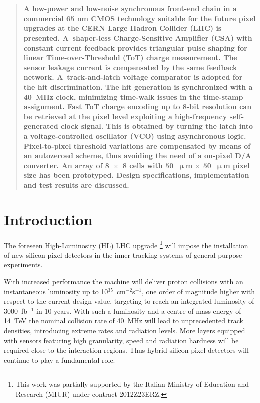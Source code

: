 \documentclass[conference]{./templates/IEEEtran/IEEEtran}
\begin{document}
\section*{  }
\begin{abstract}
{\bf A low-power and low-noise synchronous front-end chain in a commercial 65 nm CMOS technology
suitable for the future pixel upgrades at the CERN Large Hadron Collider (LHC) is 
presented. A~shaper-less Charge-Sensitive Amplifier (CSA) with constant current feedback
provides triangular pulse shaping for linear Time-over-Threshold (ToT) 
charge measurement. The sensor leakage current is compensated 
by the same feedback network. A~track-and-latch voltage comparator 
is adopted for the hit discrimination. The hit generation is synchronized with a 
40~MHz clock, minimizing time-walk issues in the time-stamp assignment. 
Fast ToT charge encoding up to 8-bit resolution can be retrieved at the pixel 
level exploiting a high-frequency self-generated clock signal. This is obtained by turning 
the latch into a voltage-controlled oscillator (VCO) using asynchronous logic. 
Pixel-to-pixel threshold variations are compensated by means of an autozeroed 
scheme, thus avoiding the need of a on-pixel D/A converter.
An array of 8~$\times$~8 cells with 50~$\bm{\upmu}$m $\times$ 50~$\bm{\upmu}$m pixel size has been prototyped.
Design specifications, implementation and test results are discussed.}
\end{abstract}




\vspace*{1.2cm}

\section{Introduction}


\noindent The foreseen High-Luminosity (HL) LHC upgrade \cite{Rossi2012}
\let\thefootnote\relax\footnote{This work was partially 
supported by the Italian Ministry of Education and Research 
(MIUR) under contract 2012Z23ERZ.}
will impose the installation of new silicon pixel detectors 
in the inner tracking systems of general-purpose experiments. 

With increased performance the machine will deliver proton
collisions with an instantaneous luminosity up to 10$^{35}$~cm$^{-2}$s$^{-1}$, 
one order of magnitude higher with respect to the current design value, targeting 
to reach an integrated luminosity of 3000~fb$^{-1}$ in 10 years.
With such a luminosity and a centre-of-mass energy of 14~TeV the nominal collision 
rate of 40~MHz will lead to unprecedented track densities, introducing extreme rates and radiation levels.
More layers equipped with sensors featuring high granularity, speed and radiation 
hardness will be required close to the interaction regions. Thus hybrid silicon pixel detectors 
will continue to play a fundamental role.
\end{document}
